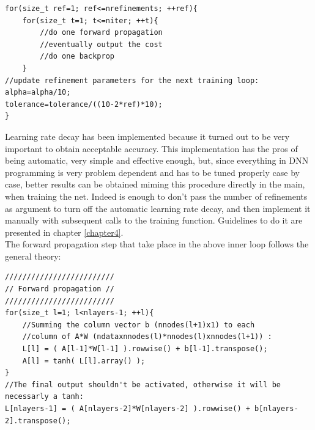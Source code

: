\documentclass[12pt, a4paper]{report}
\theoremstyle{definition}
\begin{document}
{\begin{lstlisting}[frame=single]
for(size_t ref=1; ref<=nrefinements; ++ref){
	for(size_t t=1; t<=niter; ++t){
		//do one forward propagation
		//eventually output the cost
		//do one backprop
	}
//update refinement parameters for the next training loop:
alpha=alpha/10;
tolerance=tolerance/((10-2*ref)*10);
} 
\end{lstlisting} 
Learning rate decay has been implemented because it turned out to be very important to obtain acceptable accuracy. This implementation has the pros of being automatic, very simple and effective enough, but, since everything in DNN programming is very problem dependent and has to be tuned properly case by case, better results can be obtained miming this procedure directly in the main, when training the net. Indeed is enough to don't pass the number of refinements as argument to turn off the automatic learning rate decay, and then implement it manually with subsequent calls to the training function. Guidelines to do it are presented in chapter \ref{chapter4}.\\
The forward propagation step that take place in the above inner loop follows the general theory:
\begin{lstlisting}[frame=single]
/////////////////////////
// Forward propagation //
/////////////////////////
for(size_t l=1; l<nlayers-1; ++l){
	//Summing the column vector b (nnodes(l+1)x1) to each 
	//column of A*W (ndataxnnodes(l)*nnodes(l)xnnodes(l+1)) :
	L[l] = ( A[l-1]*W[l-1] ).rowwise() + b[l-1].transpose();
	A[l] = tanh( L[l].array() );
}	
//The final output shouldn't be activated, otherwise it will be necessarly a tanh:
L[nlayers-1] = ( A[nlayers-2]*W[nlayers-2] ).rowwise() + b[nlayers-2].transpose();
	

\end{lstlisting}}
\end{document}
